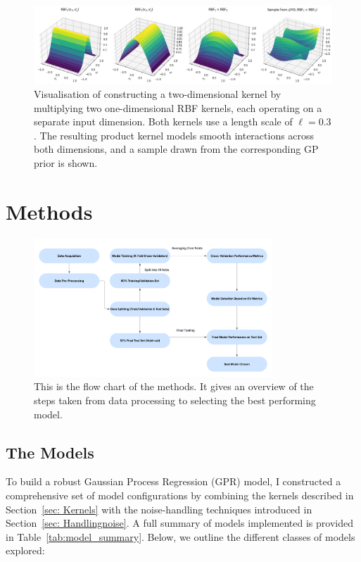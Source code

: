 \documentclass{ucdgradtaughtthesis}
\begin{document}
\begin{figure}[H]
    \centering
    \includegraphics[width=\textwidth]{LatexPlots/final_gps_plots/2dkernels.png}
    \caption[Visualising the construction of a multi-dimensional kernel.]{
    Visualisation of constructing a two-dimensional kernel by multiplying two one-dimensional RBF kernels, each operating on a separate input dimension. Both kernels use a length scale of \(\ell = 0.3\). 
    The resulting product kernel models smooth interactions across both dimensions, and a sample drawn from the corresponding GP prior is shown.}
    \label{fig:2dkernels}
\end{figure}

\chapter{Methods}
\begin{figure}[H]
    \centering
   \includegraphics[width=0.8\textwidth]{LatexPlots/Flowchart.png}
    \caption[Flow chart of the process taken from data processing to selecting the best performing model.]{This is the flow chart of the methods. It gives an overview of the steps taken
     from data processing to selecting the best performing model.}
    \label{fig:flowchart}
\end{figure}
\section{The Models}
\label{subsec:Models}
To build a robust Gaussian Process Regression (GPR) model, I constructed a comprehensive set of model configurations by combining the kernels described in Section~\ref{sec: Kernels} with the noise-handling techniques introduced in Section~\ref{sec: Handlingnoise}. 
A full summary of models implemented is provided in Table~\ref{tab:model_summary}. Below, we outline the different classes of models explored:
\end{document}
